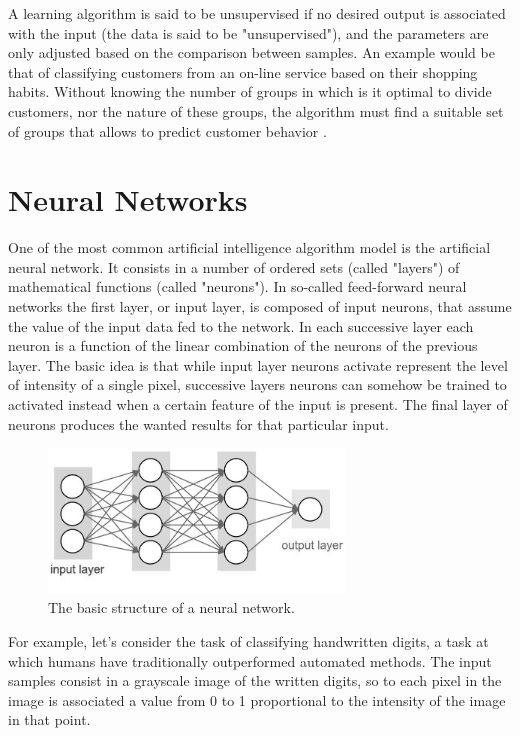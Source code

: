 \documentclass[a4paper]{report}
\begin{document}
A learning algorithm is said to be unsupervised if no desired output is associated with the input (the data is said to be "unsupervised"), and the parameters are only adjusted based on the comparison between samples.
An example would be that of classifying customers from an on-line service based on their shopping habits.
Without knowing the number of groups in which is it optimal to divide customers, nor the nature of these groups, the algorithm must find a suitable set of groups that allows to predict customer behavior \cite{bishop2006pattern}.

\section{Neural Networks}
One of the most common artificial intelligence algorithm model is the artificial neural network.
It consists in a number of ordered sets (called "layers") of mathematical functions (called "neurons").
In so-called feed-forward neural networks the first layer, or input layer, is composed of input neurons, that assume the value of the input data fed to the network.
In each successive layer each neuron is a function of the linear combination of the neurons of the previous layer.
The basic idea is that while input layer neurons activate represent the level of intensity of a single pixel, successive layers neurons can somehow be trained to activated instead when a certain feature of the input is present.
The final layer of neurons produces the wanted results for that particular input.
\begin{figure} [H]
\centering
\includegraphics [width=0.7\textwidth] {o/neuralnetwork.png}
\caption{The basic structure of a neural network.}
\end{figure}
For example, let's consider the task of classifying handwritten digits, a task at which humans have traditionally outperformed automated methods.
The input  samples consist in a grayscale image of the written digits, so to each pixel in the image is associated a value from 0 to 1 proportional to the intensity of the image in that point.
\end{document}
